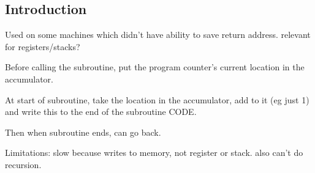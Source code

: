 
\subsection{Introduction}

Used on some machines which didn't have ability to save return address. relevant for registers/stacks?

Before calling the subroutine, put the program counter's current location in the accumulator.

At start of subroutine, take the location in the accumulator, add to it (eg just 1) and write this to the end of the subroutine CODE.

Then when subroutine ends, can go back.

Limitations: slow because writes to memory, not register or stack. also can't do recursion.

